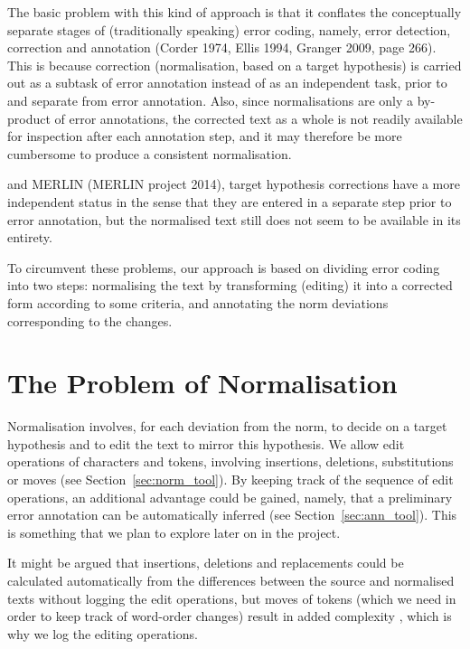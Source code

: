 \documentclass[10pt, a4paper]{article}
\begin{document}
The basic problem with this kind of approach is that it conflates the conceptually separate stages of (traditionally speaking) error coding, namely, error detection, correction and annotation (Corder 1974, Ellis 1994, Granger 2009, page 266). This is because correction (normalisation, based on a target hypothesis) is carried out as a subtask of error annotation instead of as an independent task, prior to and separate from error annotation. Also, since normalisations are only a by-product of error annotations, the corrected text as a whole is not readily available for inspection after each annotation step, and it may therefore be more cumbersome to produce a consistent normalisation.

\cite{ludeling05multi-levelerror}
and MERLIN (MERLIN project 2014), target hypothesis corrections have a more independent status in the sense that they are entered in a separate step prior to error annotation, but the normalised text still does not seem to be available in its entirety.

To circumvent these problems, our approach is based on dividing error coding into two steps: normalising the text by transforming (editing) it into a corrected form according to some criteria, and annotating the norm deviations corresponding to the changes.

\section{The Problem of Normalisation}

Normalisation involves, for each deviation from the norm, to decide on a target hypothesis and to edit the text to mirror this hypothesis. We allow edit operations of characters and tokens, involving insertions, deletions, substitutions %
or moves (see Section~\ref{sec:norm_tool}). By keeping track of the sequence of edit operations, an additional advantage could be gained, namely, that a preliminary error annotation can be automatically inferred (see Section~\ref{sec:ann_tool}). This is something that we plan to explore later on in the project.

It might be argued that insertions, deletions and
replacements could be calculated automatically from the differences between the source and normalised texts without logging the edit operations, but moves of tokens (which we need in order to keep track of word-order changes) result in added complexity \cite{ShapiraStorer2007}, which is why we log the editing operations.
\end{document}
